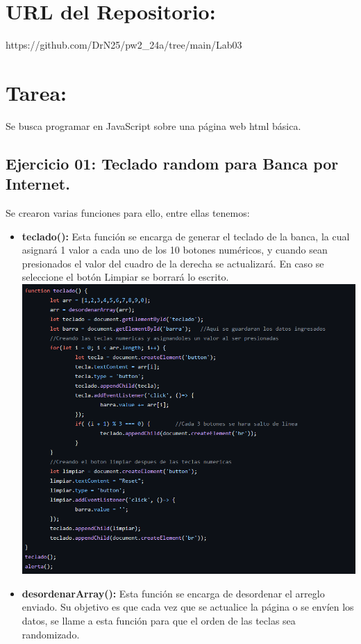 \documentclass{article}
\begin{document}
\section{URL del Repositorio:}
https://github.com/DrN25/pw2\_24a/tree/main/Lab03
	
\section{Tarea:}
Se busca programar en JavaScript sobre una página web html básica.
\subsection*{Ejercicio 01: Teclado random para Banca por Internet.}
Se crearon varias funciones para ello, entre ellas tenemos:
\begin{itemize}
    \item \textbf{teclado(): } Esta función se encarga de generar el teclado de la banca, la cual asignará 1 valor a cada uno de los 10 botones numéricos, y cuando sean presionados el valor del cuadro de la derecha se actualizará. En caso se seleccione el botón Limpiar se borrará lo escrito.\\



\includegraphics[width=\textwidth]{img/2.png}
\item \textbf{desordenarArray(): } Esta función se encarga de desordenar el arreglo enviado. Su objetivo es que cada vez que se actualice la página o se envíen los datos, se llame a esta función para que el orden de las teclas sea randomizado.\\




\end{itemize}
\end{document}
